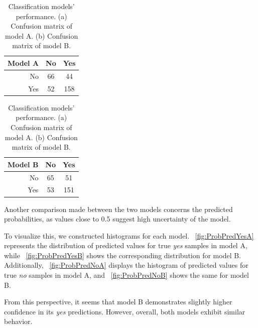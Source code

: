 \begin{table}[h]
	\begin{subtable}{0.4\textwidth}
		\centering
		\begin{tabular}{|| cr | cc ||}    
			\hline
			\multicolumn{2}{|c|}{Model A} 
			& No & Yes \\
			\hline
			\hline
			& No & 66 & 44 \\
			& Yes & 52 & 158 \\
			\hline
		\end{tabular}
		\caption{}
		\label{table:ConfMatModA}
	\end{subtable}
	\hfill
	\begin{subtable}{0.4\textwidth}
		\centering
		\begin{tabular}{|| cr | cc ||}    
			\hline
			\multicolumn{2}{|c|}{Model B} 
			& No & Yes \\
			\hline
			\hline
			& No & 65 & 51 \\
			& Yes & 53 & 151 \\
			\hline
		\end{tabular}
		\caption{}
		\label{table:ConfMatModB}
	\end{subtable}
	\caption{Classification models' performance. (a) Confusion matrix of model A. (b) Confusion matrix of model B.}
	\label{table:ConfMat}
\end{table}


Another comparison made between the two models concerns the predicted probabilities, as values close to 0.5 suggest high uncertainty of the model.

To visualize this, we constructed histograms for each model. \Fig~\ref{fig:ProbPredYesA} represents the distribution of predicted values for true \textit{yes} samples in model A, while \Fig~\ref{fig:ProbPredYesB} shows the corresponding distribution for model B. Additionally, \Fig~\ref{fig:ProbPredNoA} displays the histogram of predicted values for true \textit{no} samples in model A, and \Fig~\ref{fig:ProbPredNoB} shows the same for model B.

From this perspective, it seems that model B demonstrates slightly higher confidence in its \textit{yes} predictions. However, overall, both models exhibit similar behavior.


